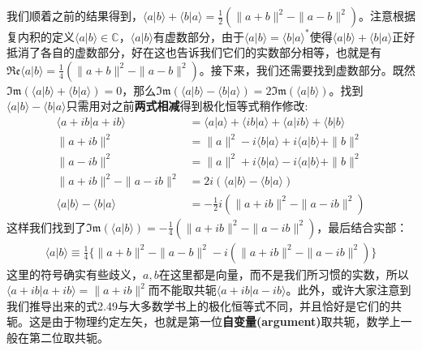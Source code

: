 \documentclass[mathserif,hyperref,UTF8,openany,b5paper]{ctexbook}
\begin{document}
我们顺着之前的结果得到，$\langle a|b\rangle+\langle b|a\rangle= \frac{1}{2}(\|a+b\|^2-\|a-b\|^2)$。注意根据复内积的定义$\langle a|b\rangle\in\mathbb{C}$，$\langle a|b\rangle$有虚数部分，由于$\langle a|b\rangle=\langle b|a\rangle^*$使得$\langle a|b\rangle+\langle b|a\rangle$正好抵消了各自的虚数部分，好在这也告诉我们它们的实数部分相等，也就是有$\mathfrak{Re}\langle a|b\rangle= \frac{1}{4}(\|a+b\|^2-\|a-b\|^2)$。接下来，我们还需要找到虚数部分。既然$\mathfrak{Im}(\langle a|b\rangle+\langle b|a\rangle)=0$，那么$\mathfrak{Im}(\langle a|b\rangle-\langle b|a\rangle)=2\mathfrak{Im}(\langle a|b\rangle)$。找到$\langle a|b\rangle-\langle b|a\rangle$只需用对之前\textbf{两式相减}得到极化恒等式稍作修改:
\begin{align}
    \langle a+ib|a+ib\rangle&=\langle a|a\rangle+\langle ib|a\rangle+\langle a|ib\rangle + \langle b|b\rangle\\
    \|a+ib\|^2 &= \|a\|^2-i\langle b|a\rangle+i\langle a|b\rangle+\|b\|^2\\
    \|a-ib\|^2 &= \|a\|^2+i\langle b|a\rangle -i\langle a|b\rangle+\|b\|^2\\
    \|a+ib\|^2-\|a-ib\|^2&=2i(\langle a|b\rangle-\langle b|a\rangle)\\
    \langle a|b\rangle-\langle b|a\rangle&=-\frac{1}{2}i(\|a+ib\|^2-\|a-ib\|^2)
\end{align}
这样我们找到了$\mathfrak{Im}(\langle a|b\rangle)=-\frac{1}{4}(\|a+ib\|^2-\|a-ib\|^2)$，最后结合实部：
\begin{align}
	\langle a|b\rangle \equiv \frac{1}{4}\{\|a+b\|^2-\|a-b\|^2 - i(\|a+ib\|^2-\|a-ib\|^2)\}
\end{align}
这里的符号确实有些歧义，$a,b$在这里都是向量，而不是我们所习惯的实数，所以$\langle a+ib|a+ib\rangle=\|a+ib\|^2$而不能取共轭$\langle a+ib|a-ib\rangle$。此外，或许大家注意到我们推导出来的式2.49与大多数学书上的极化恒等式不同，并且恰好是它们的共轭。这是由于物理约定左矢，也就是第一位\textbf{自变量(argument)}取共轭，数学上一般在第二位取共轭。
\end{document}
